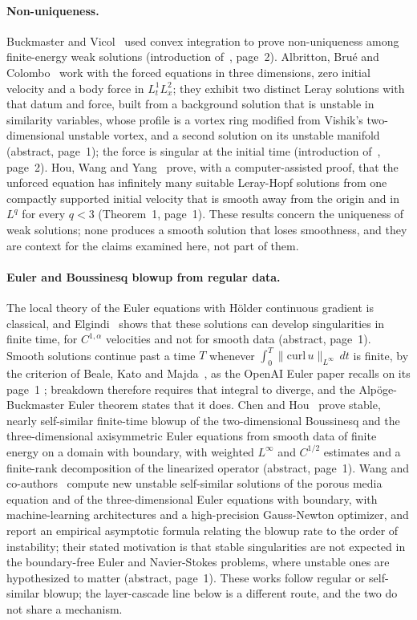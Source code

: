 \documentclass[11pt]{article}
\theoremstyle{remark}
\newcommand{\ev}[1]{\hspace{0.2em}{\small\textsf{[#1]}}}
\begin{document}
\paragraph{Non-uniqueness.} Buckmaster and Vicol~\cite{bv} used convex integration to prove non-uniqueness
among finite-energy weak solutions \ev{U} (introduction of~\cite{openai-ns}, page~2). Albritton, Bru\'e and
Colombo~\cite{abc} work with the forced equations in three dimensions, zero initial velocity and a body force
in $L^{1}_{t}L^{2}_{x}$; they exhibit two distinct Leray solutions with that datum and force, built from a
background solution that is unstable in similarity variables, whose profile is a vortex ring modified from
Vishik's two-dimensional unstable vortex, and a second solution on its unstable manifold \ev{V} (abstract,
page~1); the force is singular at the initial time \ev{V} (introduction of~\cite{openai-ns}, page~2).
Hou, Wang and Yang~\cite{hwy} prove, with a computer-assisted proof, that the unforced equation has
infinitely many suitable Leray-Hopf solutions from one compactly supported initial velocity that is smooth
away from the origin and in $L^{q}$ for every $q<3$ \ev{V} (Theorem~1, page~1). These results concern the
uniqueness of weak solutions; none produces a smooth solution that loses smoothness, and they are context
for the claims examined here, not part of them.

\paragraph{Euler and Boussinesq blowup from regular data.} The local theory of the Euler equations
with H\"older continuous gradient is classical, and Elgindi~\cite{elgindi} shows that these solutions can
develop singularities in finite time, for $C^{1,\alpha}$ velocities and not for smooth data \ev{V}
(abstract, page~1). Smooth solutions continue past a time $T$ whenever
$\int_{0}^{T}\|\mathrm{curl}\,u\|_{L^{\infty}}\,dt$ is finite, by the criterion of Beale, Kato and
Majda~\cite{bkm}, as the OpenAI Euler paper recalls on its page~1 \ev{V}; breakdown therefore requires that
integral to diverge, and the Alp\"oge-Buckmaster Euler theorem states that it does. Chen and Hou~\cite{chenhou}
prove stable, nearly self-similar finite-time blowup of the two-dimensional Boussinesq and the
three-dimensional axisymmetric Euler equations from smooth data of finite energy on a domain with boundary,
with weighted $L^{\infty}$ and $C^{1/2}$ estimates and a finite-rank decomposition of the linearized
operator \ev{V} (abstract, page~1). Wang and co-authors~\cite{dm} compute new unstable self-similar
solutions of the porous media equation and of the three-dimensional Euler equations with boundary, with
machine-learning architectures and a high-precision Gauss-Newton optimizer, and report an empirical
asymptotic formula relating the blowup rate to the order of instability; their stated motivation is that
stable singularities are not expected in the boundary-free Euler and Navier-Stokes problems, where unstable
ones are hypothesized to matter \ev{V} (abstract, page~1). These works follow regular or self-similar blowup; the layer-cascade line below is a different route, and
the two do not share a mechanism.
\end{document}
